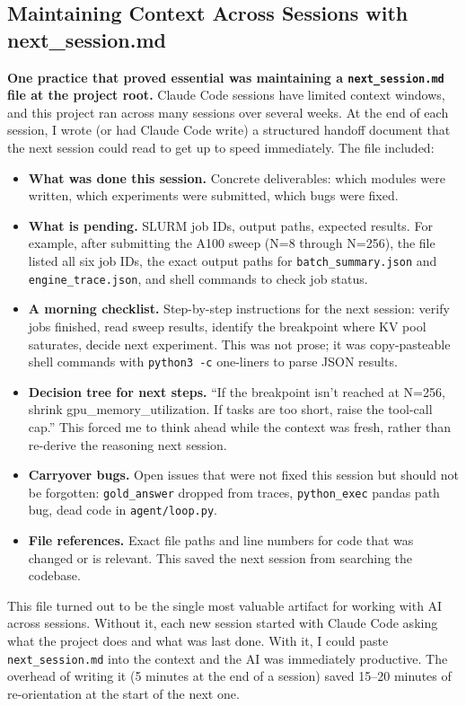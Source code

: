 \documentclass[10pt,twocolumn]{article}
\begin{document}
\subsection{Maintaining Context Across Sessions with next\_session.md}

\textbf{One practice that proved essential was maintaining a \texttt{next\_session.md} file at the project root.} Claude Code sessions have limited context windows, and this project ran across many sessions over several weeks. At the end of each session, I wrote (or had Claude Code write) a structured handoff document that the next session could read to get up to speed immediately. The file included:

\begin{itemize}[nosep,leftmargin=*]
\item \textbf{What was done this session.} Concrete deliverables: which modules were written, which experiments were submitted, which bugs were fixed.
\item \textbf{What is pending.} SLURM job IDs, output paths, expected results. For example, after submitting the A100 sweep (N=8 through N=256), the file listed all six job IDs, the exact output paths for \texttt{batch\_summary.json} and \texttt{engine\_trace.json}, and shell commands to check job status.
\item \textbf{A morning checklist.} Step-by-step instructions for the next session: verify jobs finished, read sweep results, identify the breakpoint where KV pool saturates, decide next experiment. This was not prose; it was copy-pasteable shell commands with \texttt{python3 -c} one-liners to parse JSON results.
\item \textbf{Decision tree for next steps.} ``If the breakpoint isn't reached at N=256, shrink gpu\_memory\_utilization. If tasks are too short, raise the tool-call cap.'' This forced me to think ahead while the context was fresh, rather than re-derive the reasoning next session.
\item \textbf{Carryover bugs.} Open issues that were not fixed this session but should not be forgotten: \texttt{gold\_answer} dropped from traces, \texttt{python\_exec} pandas path bug, dead code in \texttt{agent/loop.py}.
\item \textbf{File references.} Exact file paths and line numbers for code that was changed or is relevant. This saved the next session from searching the codebase.
\end{itemize}

This file turned out to be the single most valuable artifact for working with AI across sessions. Without it, each new session started with Claude Code asking what the project does and what was last done. With it, I could paste \texttt{next\_session.md} into the context and the AI was immediately productive. The overhead of writing it (5 minutes at the end of a session) saved 15--20 minutes of re-orientation at the start of the next one.
\end{document}
